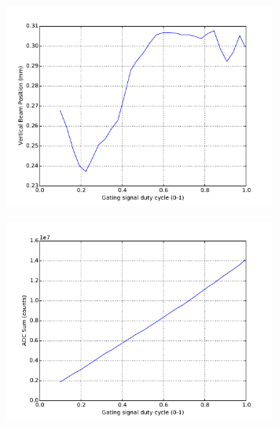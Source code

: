 \documentclass[a4paper, 11pt]{article}%
\begin{document}
%


\begin{figure}[htbp]%
\centering%
\includegraphics[width=0.8\textwidth]{./Results/DC_vs_Y.pdf}%
\caption{}%
\end{figure}

%


\begin{figure}[htbp]%
\centering%
\includegraphics[width=0.8\textwidth]{./Results/DC_vs_ADC_sum.pdf}%
\caption{}%
\end{figure}

%
\clearpage%
\end{document}
